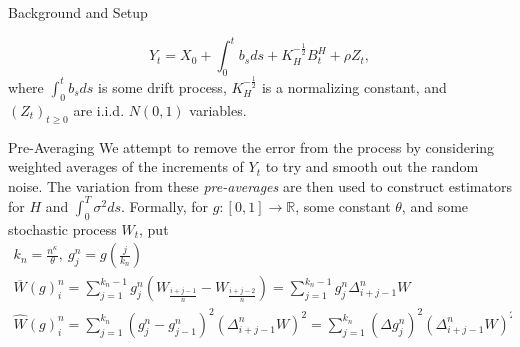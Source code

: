 \documentclass[final,hyperref={pdfpagelabels=false}]{beamer}
\newcommand{\R}{\mathbb{R}}
\begin{document}
\begin{frame}{}
\begin{columns}[t]
\begin{column}{0.28\linewidth}
\begin{block}{Background and Setup}
\begin{itemize}
              \[
                Y_t = X_0 + \int_0^t b_sds + K^{-\frac{1}{2}}_HB^H_t + \rho Z_t,
              \]
              where \(\int_0^t b_sds\) is some drift process, \(K^{-\frac{1}{2}}_H\) is a normalizing constant, and \((Z_t)_{t \geq 0}\) are i.i.d. \(N(0,1)\) variables.
          \end{itemize}
        \end{block}
        \begin{block}{Pre-Averaging}
          We attempt to remove the error from the process by considering weighted averages of the increments of \(Y_t\) to try and smooth out the random noise. The variation from these \textit{pre-averages} are then used to construct estimators for \(H\) and \(\int_0^T \sigma^2 ds\). Formally, for \(g: [0,1] \rightarrow \R\), some constant \(\theta\), and some stochastic process \(W_t\), put
          \begin{gather*}
            k_n = \frac{n^\kappa}{\theta}, \ g^n_j = g\left( \frac{j}{k_n} \right) \\
            \overline{W}(g)^n_i = \sum_{j=1}^{k_n-1}g^n_j\left( W_{\frac{i+j-1}{n}} - W_{\frac{i+j-2}{n}} \right) = \sum_{j=1}^{k_n-1}g^n_j\Delta_{i+j-1}^n W \\
            \widehat{W}(g)^n_i = \sum_{j=1}^{k_n}\left(g^n_j - g^n_{j-1}\right)^2\left(\Delta_{i+j-1}^n W\right)^2 = \sum_{j=1}^{k_n}\left(\Delta g^n_j\right)^2\left(\Delta_{i+j-1}^n W\right)^2.
          \end{gather*}
        \end{block}
      \end{column}


\end{columns}
\end{frame}
\end{document}
